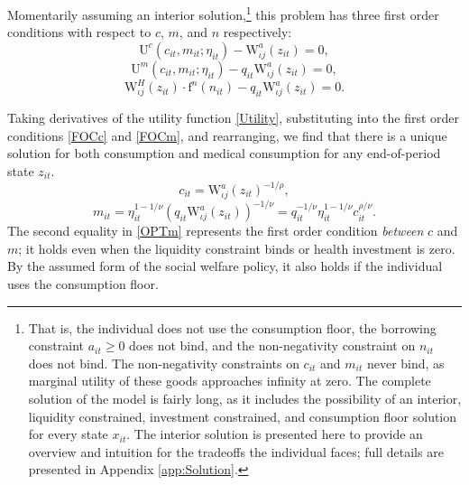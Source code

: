 \documentclass[12pt,pdftex,letterpaper]{article}
\newcommand{\PostHealth}{H}
\newcommand{\Utility}{\text{U}}
\newcommand{\PostValue}{\text{W}}
\newcommand{\Con}{c}
\newcommand{\Care}{m}
\newcommand{\Invst}{n}
\newcommand{\Assets}{a}
\newcommand{\Copay}{q}
\newcommand{\CRRAcon}{\rho}
\newcommand{\CRRAcare}{\nu}
\newcommand{\MedShk}{\eta}
\newcommand{\HealthProdFunc}{\text{f}}
\newcommand{\State}{x}
\newcommand{\PostState}{z}
\begin{document}
Momentarily assuming an interior solution,\footnote{That is, the individual does not use the consumption floor, the borrowing constraint $\Assets_{it} \geq 0$ does not bind, and the non-negativity constraint on $\Invst_{it}$ does not bind.  The non-negativity constraints on $\Con_{it}$ and $\Care_{it}$ never bind, as marginal utility of these goods approaches infinity at zero.  The complete solution of the model is fairly long, as it includes the possibility of an interior, liquidity constrained, investment constrained, and consumption floor solution for every state $\State_{it}$. The interior solution is presented here to provide an overview and intuition for the tradeoffs the individual faces; full details are presented in Appendix \ref{app:Solution}.} this problem has three first order conditions with respect to $\Con$, $\Care$, and $\Invst$ respectively:
\begin{equation}\label{FOCc}
\Utility^\Con(\Con_{it},\Care_{it};\MedShk_{it}) - \PostValue_{\iota j}^\Assets(\PostState_{it}) = 0,
\end{equation}
\begin{equation}\label{FOCm}
\Utility^\Care(\Con_{it},\Care_{it};\MedShk_{it}) - \Copay_{it} \PostValue_{\iota j}^\Assets(\PostState_{it}) = 0,
\end{equation}
\begin{equation}\label{FOCn}
\PostValue_{\iota j}^\PostHealth(\PostState_{it}) \cdot \HealthProdFunc^\Invst(\Invst_{it}) - \Copay_{it} \PostValue_{\iota j}^\Assets(\PostState_{it}) = 0.
\end{equation}

Taking derivatives of the utility function \eqref{Utility}, substituting into the first order conditions \eqref{FOCc} and \eqref{FOCm}, and rearranging, we find that there is a unique solution for both consumption and medical consumption for any end-of-period state $\PostState_{it}$.
\begin{equation}\label{OPTc}
\Con_{it} = \PostValue_{\iota j}^\Assets(\PostState_{it})^{-1/\CRRAcon},
\end{equation}
\begin{equation}\label{OPTm}
\Care_{it} = \MedShk_{it}^{1-1/\CRRAcare} \left( \Copay_{it} \PostValue_{\iota j}^\Assets (\PostState_{it}) \right)^{-1/\CRRAcare} = \Copay_{it}^{-1/\CRRAcare} \MedShk_{it}^{1-1/\CRRAcare} \Con_{it}^{\CRRAcon/\CRRAcare}.
\end{equation}
The second equality in \eqref{OPTm} represents the first order condition \textit{between} $\Con$ and $\Care$; it holds even when the liquidity constraint binds or health investment is zero.  By the assumed form of the social welfare policy, it also holds if the individual uses the consumption floor.
\end{document}
